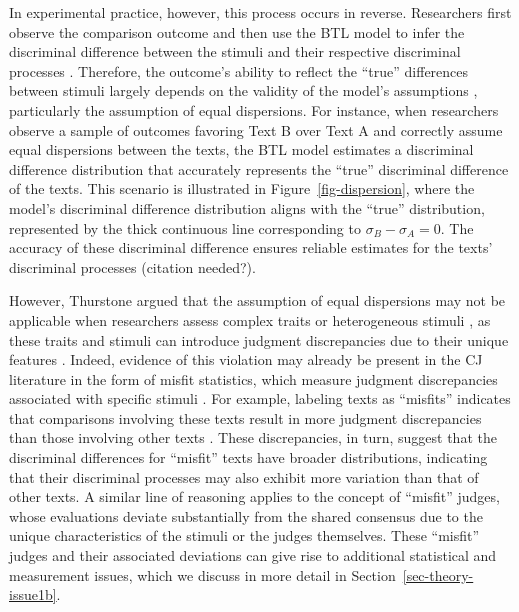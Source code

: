 \documentclass[
  authoryear,
  review,
  1p]{elsarticle}
\begin{document}
In experimental practice, however, this process occurs in reverse.
Researchers first observe the comparison outcome and then use the BTL
model to infer the discriminal difference between the stimuli and their
respective discriminal processes \citep[pp.~373]{Thurstone_1927a}.
Therefore, the outcome's ability to reflect the ``true'' differences
between stimuli largely depends on the validity of the model's
assumptions \citep[pp.~150]{Kohler_et_al_2019}, particularly the
assumption of equal dispersions. For instance, when researchers observe
a sample of outcomes favoring Text B over Text A and correctly assume
equal dispersions between the texts, the BTL model estimates a
discriminal difference distribution that accurately represents the
``true'' discriminal difference of the texts. This scenario is
illustrated in Figure~\ref{fig-dispersion}, where the model's
discriminal difference distribution aligns with the ``true''
distribution, represented by the thick continuous line corresponding to
\(\sigma_{B}-\sigma_{A}=0\). The accuracy of these discriminal
difference ensures reliable estimates for the texts' discriminal
processes {(citation needed?)}.

However, Thurstone argued that the assumption of equal dispersions may
not be applicable when researchers assess complex traits or
heterogeneous stimuli \citep[pp.~376]{Thurstone_1927a}, as these traits
and stimuli can introduce judgment discrepancies due to their unique
features
\citep{vanDaal_et_al_2016, Lesterhuis_2018, Chambers_et_al_2022}.
Indeed, evidence of this violation may already be present in the CJ
literature in the form of misfit statistics, which measure judgment
discrepancies associated with specific stimuli
\citetext{\citealp[pp.~12]{Pollitt_2004}; \citealp[pp.~20]{Goossens_et_al_2018}}.
For example, labeling texts as ``misfits'' indicates that comparisons
involving these texts result in more judgment discrepancies than those
involving other texts
\citep{Pollitt_2012a, Pollitt_2012b, vanDaal_et_al_2016, Goossens_et_al_2018}.
These discrepancies, in turn, suggest that the discriminal differences
for ``misfit'' texts have broader distributions, indicating that their
discriminal processes may also exhibit more variation than that of other
texts. A similar line of reasoning applies to the concept of ``misfit''
judges, whose evaluations deviate substantially from the shared
consensus due to the unique characteristics of the stimuli or the judges
themselves. These ``misfit'' judges and their associated deviations can
give rise to additional statistical and measurement issues, which we
discuss in more detail in Section~\ref{sec-theory-issue1b}.
\end{document}
